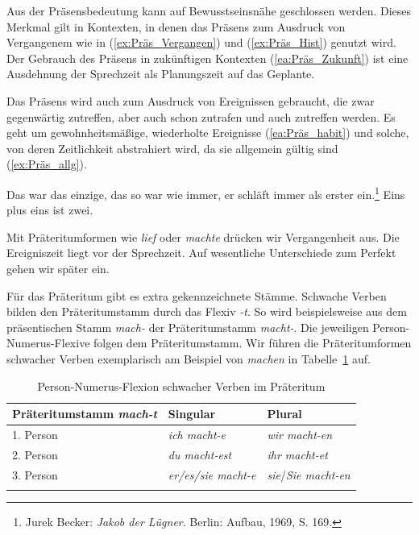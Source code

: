 Aus der Präsensbedeutung  kann auf Bewusstseinsnähe geschlossen werden. Dieses Merkmal gilt in Kontexten, in denen das Präsens zum Ausdruck von Vergangenem wie in (\ref{ex:Präs_Vergangen}) und (\ref{ex:Präs_Hist}) genutzt wird. Der Gebrauch des Präsens in zukünftigen Kontexten (\ref{ea:Präs_Zukunft}) ist eine Ausdehnung der Sprechzeit als Planungszeit auf das Geplante. 

Das Präsens wird auch zum Ausdruck von Ereignissen gebraucht, die zwar gegenwärtig zutreffen, aber auch schon zutrafen und auch zutreffen werden. Es geht um gewohnheitsmäßige, wiederholte Ereignisse (\ref{ea:Präs_habit}) und solche, von deren Zeitlichkeit abstrahiert wird, da sie allgemein gültig sind (\ref{ex:Präs_allg}).

\ea \label{ea:Präs_habit_allgemein}
\ea \label{ea:Präs_habit} Das war das einzige, das so war wie immer, er schläft immer als erster ein.\footnote{Jurek Becker: \textit{Jakob der Lügner}. Berlin: Aufbau, 1969, S. 169.}
\ex \label{ex:Präs_allg} Eins plus eins ist zwei. 
\z 
\z 


\label{subsubsubsection:Präteritum}

Mit Präteritumformen wie \textit{lief} oder \textit{machte} drücken wir Vergangenheit aus. Die Ereigniszeit liegt vor der Sprechzeit. Auf wesentliche Unterschiede zum Perfekt gehen wir später ein.

Für das Präteritum gibt es extra gekennzeichnete Stämme. Schwache Verben bilden den Präteritumstamm durch das Flexiv \textit{-t}. So wird beispielsweise aus dem präsentischen Stamm \textit{mach-} der Präteritumstamm \textit{macht-}. Die jeweiligen Person-Numerus-Flexive folgen dem Präteritumstamm. Wir führen die Präteritumformen schwacher Verben exemplarisch am Beispiel von \textit{machen} in Tabelle~\ref{tab:Pers_Num_Flexion_sw_V_Prät} auf.

\begin{table}
  \centering
  \begin{tabular}{l l l}
    \lsptoprule
    Präteritumstamm \textit{mach-t} & Singular & Plural \\
    \hline
    1. Person & \textit{ich macht-e}  & \textit{wir macht-en} \\
    2. Person & \textit{du macht-est}  & \textit{ihr macht-et} \\
    3. Person & \textit{er/es/sie macht-e} & \textit{sie}/\textit{Sie macht-en} \\
    \lspbottomrule 
  \end{tabular}
  \caption{Person-Numerus-Flexion schwacher Verben im Präteritum}
  \label{tab:Pers_Num_Flexion_sw_V_Prät}
\end{table}


